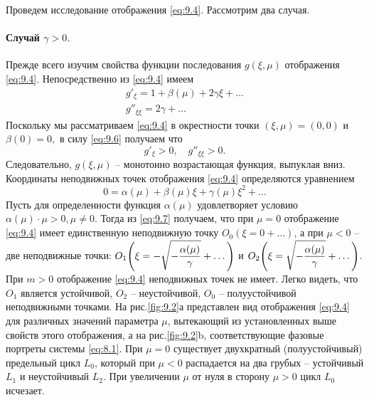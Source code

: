 Проведем исследование отображения \eqref{eq:9.4}. Рассмотрим два случая.

\paragraph{Случай $\gamma>0.$}%
Прежде всего изучим свойства функции последования $g(\xi,\mu)$ отображения
\eqref{eq:9.4}. Непосредственно из \eqref{eq:9.4} имеем
\begin{equation}
        \label{eq:9.6}
        \begin{gathered}
                g'_{\xi} = 1 + \beta(\mu) + 2 \gamma \xi+ \dots \\
                g''_{\xi\xi} = 2 \gamma + \dots
        \end{gathered}
\end{equation}
Поскольку мы рассматриваем \eqref{eq:9.4} в окрестности точки $(\xi,\mu)=(0,0)$ и $\beta(0)=0,$ 
в силу \eqref{eq:9.6} получаем что
\begin{equation}
        \label{eq:}
        g'_{\xi}>0,\quad g''_{\xi\xi}>0.
\end{equation}
Следовательно, $g(\xi,\mu)$ -- монотонно возрастающая функция, выпуклая вниз.
Координаты неподвижных точек отображения \eqref{eq:9.4} определяются уравнением
\begin{equation}
        \label{eq:9.7}
        0 = \alpha(\mu) + \beta(\mu) \xi + \gamma(\mu) \xi^2 + \dots
\end{equation}
Пусть для определенности функция $\alpha(\mu)$ удовлетворяет условию $\alpha(\mu)\cdot \mu>0, \mu \neq 0.$ Тогда из \eqref{eq:9.7} получаем, что при $\mu=0$ отображение \eqref{eq:9.4} имеет единственную неподвижную точку $O_0 (\xi=0+\dots)$, а при $\mu<0$ -- две неподвижные точки:
$\displaystyle O_1 \qty( \xi = - \sqrt{ -\frac{\alpha(\mu)}{\gamma}} + \dots )$ и
$\displaystyle O_2 \qty( \xi = \sqrt{ -\frac{\alpha(\mu)}{\gamma}}+\dots)$. 
При $m>0$ отображение \eqref{eq:9.4} неподвижных точек не имеет. Легко видеть, что $O_1$ является устойчивой, $O_2$ -- неустойчивой, $O_0$ -- полуустойчивой неподвижными точками.
На рис.\ref{fig:9.2}а представлен вид отображения \eqref{eq:9.4} для различных значений параметра $\mu$,
вытекающий из установленных выше свойств этого отображения, а на рис.\ref{fig:9.2}b, соответствующие
фазовые портреты системы \eqref{eq:8.1}. При $\mu=0$ существует двухкратный (полуустойчивый) предельный цикл $L_0$, который при $\mu<0$ распадается на два грубых -- устойчивый $L_1$ и неустойчивый $L_2$.
При увеличении $\mu$ от нуля в сторону $\mu>0$ цикл $L_0$ исчезает.

